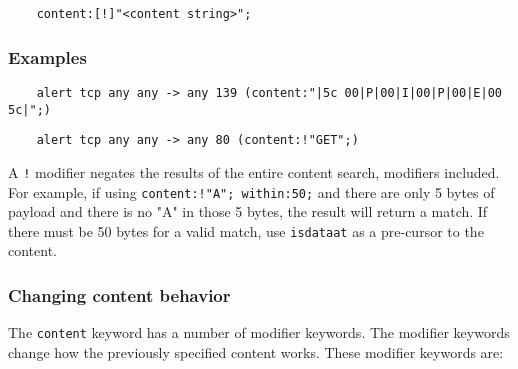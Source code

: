 \documentclass[english]{report}
\newenvironment{note}{
\samepage
    \vspace{10pt}{\textsf{
        {\hspace{7pt}\Huge{$\triangle$\hspace{-12.5pt}{\Large{$^!$}}}}\hspace{5pt}
        {\Large{NOTE}}
    }
    }
   \begin{center}
    \par\vspace{-17pt}

    \begin{lrbox}{\savepar}
    \begin{minipage}[r]{6in}
}
{
    \end{minipage}
    \end{lrbox}
    \fbox{
        \usebox{
            \savepar
	}
    }
    \par\vskip10pt
    \end{center}
}
\newenvironment{note}{
        \begin{rawhtml}
        <p><table border="1"><tr><td><b>
        Note:&nbsp;&nbsp;</b>
        \end{rawhtml}
}{
        \begin{rawhtml}
        </b></td></tr></table></p>
        \end{rawhtml}
}
\begin{document}
\begin{verbatim}
    content:[!]"<content string>";
\end{verbatim}

\subsubsection{Examples}

\begin{verbatim}
    alert tcp any any -> any 139 (content:"|5c 00|P|00|I|00|P|00|E|00 5c|";)
\end{verbatim}

\begin{verbatim}
    alert tcp any any -> any 80 (content:!"GET";)
\end{verbatim}

\begin{note}

A \texttt{!} modifier negates the results of the entire content search,
modifiers included.  For example, if using \texttt{content:!"A"; within:50;}
and there are only 5 bytes of payload and there is no "A" in those 5 bytes, the
result will return a match.  If there must be 50 bytes for a valid match, use
\texttt{isdataat} as a pre-cursor to the content.

\end{note}

\subsubsection{Changing content behavior}

The \texttt{content} keyword has a number of modifier keywords.  The modifier
keywords change how the previously specified content works.  These modifier
keywords are:
\end{document}
